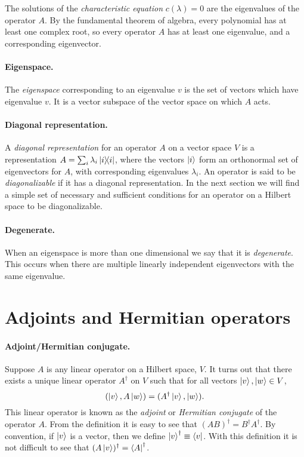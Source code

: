 The solutions of the \emph{characteristic equation} $c(\lambda) = 0$ are the
eigenvalues of the operator $A$. By the fundamental theorem of algebra, every
polynomial has at least one complex root, so every operator $A$ has at least
one eigenvalue, and a corresponding eigenvector.

\paragraph{Eigenspace.} The \emph{eigenspace} corresponding to an eigenvalue
$v$ is the set of vectors which have eigenvalue $v$. It is a vector subspace of
the vector space on which $A$ acts.

\paragraph{Diagonal representation.} A \emph{diagonal representation} for an
operator $A$ on a vector space $V$ is a representation $A = \sum_i \lambda_i
\ketbra{i}{i}$, where the vectors $\ket{i}$ form an orthonormal set of
eigenvectors for $A$, with corresponding eigenvalues $\lambda_i$. An operator
is said to be \emph{diagonalizable} if it has a diagonal representation. In the
next section we will find a simple set of necessary and sufficient conditions
for an operator on a Hilbert space to be diagonalizable.

\paragraph{Degenerate.} When an eigenspace is more than one dimensional we say
that it is \emph{degenerate}. This occurs when there are multiple linearly
independent eigenvectors with the same eigenvalue.

\section{Adjoints and Hermitian operators}

\paragraph{Adjoint/Hermitian conjugate.} Suppose $A$ is any linear operator on
a Hilbert space, $V$. It turns out that there exists a unique linear operator
$A^\dagger$ on $V$ such that for all vectors $\ket{v}, \ket{w} \in V$,
\begin{equation}
  (\ket{v}, A\ket{w}) = (A^\dagger \ket{v}, \ket{w}). \label{eq:adj}
\end{equation}
This linear operator is known as the \emph{adjoint} or \emph{Hermitian
conjugate} of the operator $A$. From the definition it is easy to see that
$(AB)^\dagger = B^\dagger A^\dagger$. By convention, if $\ket{v}$ is a vector,
then we define $\ket{v}^\dagger \equiv \bra{v}$. With this definition it is not
difficult to see that $(A\ket{v})^\dagger = \bra A^\dagger$.

